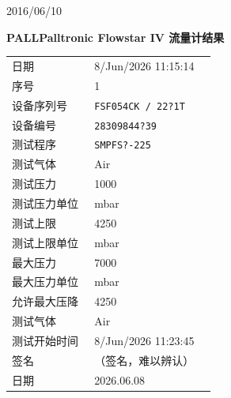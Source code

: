 \documentclass[UTF8,10pt,a4paper,fontset=fandol]{ctexart}
\newcommand{\fieldvalue}[1]{#1}
\newcommand{\handwritten}[1]{#1}
\begin{document}
\handwritten{2016/06/10}


\newpage

\begin{center}
\textbf{PALL\quad Palltronic Flowstar IV 流量计结果}
\end{center}

\begin{minipage}[t]{0.48\linewidth}
\small
\begin{tabular}{@{}p{0.38\linewidth}p{0.56\linewidth}@{}}
日期 &
\fieldvalue{8/Jun/2026 11:15:14}
\\
序号 &
\fieldvalue{1}
\\
设备序列号 &
\fieldvalue{\texttt{FSF054CK / 22?1T}}
\\
设备编号 &
\fieldvalue{\texttt{28309844?39}}
\\
测试程序 &
\fieldvalue{\texttt{SMPFS?-225}}
\\
测试气体 &
\fieldvalue{Air}
\\
测试压力 &
\fieldvalue{1000}
\\
测试压力单位 &
\fieldvalue{mbar}
\\
测试上限 &
\fieldvalue{4250}
\\
测试上限单位 &
\fieldvalue{mbar}
\\
最大压力 &
\fieldvalue{7000}
\\
最大压力单位 &
\fieldvalue{mbar}
\\
允许最大压降 &
\fieldvalue{4250\ \mathrm{mbar}}
\\
测试气体 &
\fieldvalue{Air}
\\
测试开始时间 &
\fieldvalue{8/Jun/2026 11:23:45}
\\
签名 &
\fieldvalue{\handwritten{（签名，难以辨认）}}
\\
日期 &
\fieldvalue{\handwritten{2026.06.08}}
\end{tabular}
\end{minipage}
\end{document}
